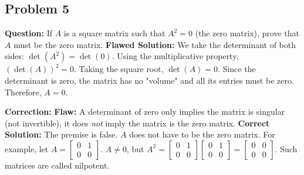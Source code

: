 \documentclass{article}
\begin{document}
\subsection{Problem 5}
\textbf{Question:} If $A$ is a square matrix such that $A^2 = 0$ (the zero matrix), prove that $A$ must be the zero matrix.
\textbf{Flawed Solution:}
We take the determinant of both sides: $\det(A^2) = \det(0)$.
Using the multiplicative property, $(\det(A))^2 = 0$.
Taking the square root, $\det(A) = 0$.
Since the determinant is zero, the matrix has no "volume" and all its entries must be zero. Therefore, $A = 0$.

\textbf{Correction:}
\textbf{Flaw:} A determinant of zero only implies the matrix is singular (not invertible), it does \textit{not} imply the matrix is the zero matrix.
\textbf{Correct Solution:} The premise is false. $A$ does not have to be the zero matrix. For example, let $A = \begin{bmatrix} 0 & 1 \\ 0 & 0 \end{bmatrix}$. $A \neq 0$, but $A^2 = \begin{bmatrix} 0 & 1 \\ 0 & 0 \end{bmatrix} \begin{bmatrix} 0 & 1 \\ 0 & 0 \end{bmatrix} = \begin{bmatrix} 0 & 0 \\ 0 & 0 \end{bmatrix}$. Such matrices are called nilpotent.
\end{document}
